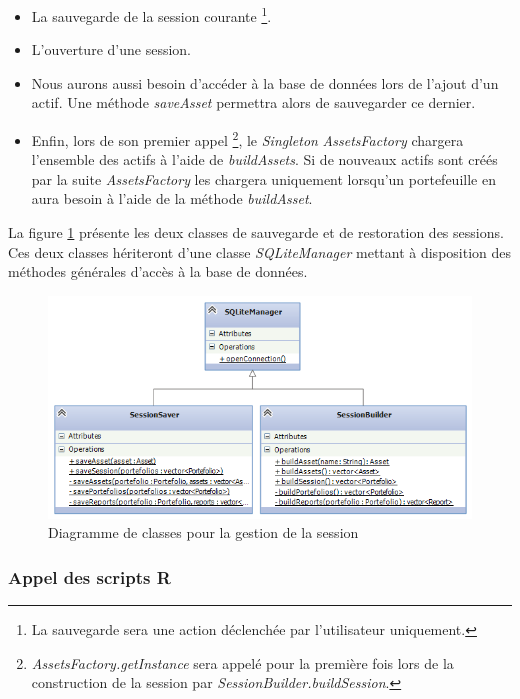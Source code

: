 \documentclass[a4paper,titlepage,french]{report}
\begin{document}
\begin{itemize}
	\item La sauvegarde de la session courante \footnote{La sauvegarde sera une action déclenchée par l'utilisateur uniquement.}.
  	\item L'ouverture d'une session.
  	\item Nous aurons aussi besoin d'accéder à la base de données lors de l'ajout d'un actif.
	Une méthode \textit{saveAsset} permettra alors de sauvegarder ce dernier.
  	\item Enfin, lors de son premier appel \footnote{\textit{AssetsFactory.getInstance} sera appelé pour la première fois lors de la construction de la session par \textit{SessionBuilder.buildSession}.}, le \textit{Singleton} \textit{AssetsFactory} chargera l'ensemble des actifs à l'aide de \textit{buildAssets}.
	Si de nouveaux actifs sont créés par la suite \textit{AssetsFactory} les chargera uniquement lorsqu'un portefeuille en aura besoin à l'aide de la méthode \textit{buildAsset}.
\end{itemize}

La figure \ref{fig:diagramme-classes-interface-bdd} présente les deux classes de sauvegarde et de restoration des sessions. Ces deux classes hériteront d'une classe \textit{SQLiteManager} mettant à disposition des méthodes générales d'accès à la base de données.

\begin{figure}
  	\center
  	\includegraphics[width=1\textwidth]{diagramme-classes-interface-bdd.png}
  	\caption{Diagramme de classes pour la gestion de la session}
  	\label{fig:diagramme-classes-interface-bdd}
\end{figure}


\subsubsection{Appel des scripts R}
\end{document}
